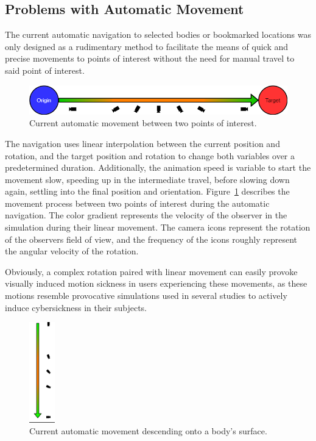 \subsection{Problems with Automatic Movement}\label{subsec:problems-with-automatic-movement}

The current automatic navigation to selected bodies or bookmarked locations was only designed as a rudimentary method
to facilitate the means of quick and precise movements to points of interest without the need for manual travel to
said point of interest.

\begin{figure}[h]
    \centering
    \includegraphics[width=\textwidth]{content/3_current_state/img/OldAutomaticNavigation}
    \caption{Current automatic movement between two points of interest.}
    \label{fig:old-auto-nav}
\end{figure}

The navigation uses linear interpolation between the current position and rotation, and the target position and
rotation to change both variables over a predetermined duration.
Additionally, the animation speed is variable to start the movement slow, speeding up in the intermediate travel,
before slowing down again, settling into the final position and orientation.
Figure~\ref{fig:old-auto-nav} describes the movement process between two points of interest during the automatic
navigation.
The color gradient represents the velocity of the observer in the simulation during their linear movement.
The camera icons represent the rotation of the observers field of view, and the frequency of the icons roughly
represent the angular velocity of the rotation.

Obviously, a complex rotation paired with linear movement can easily provoke visually induced motion sickness in
users experiencing these movements, as these motions resemble provocative simulations used in several studies to
actively induce cybersickness in their subjects.


\begin{figure}
    \centering
    \includegraphics[width=0.1\textwidth]{content/3_current_state/img/OldAutomaticNavigation_Landing}
    \caption{Current automatic movement descending onto a body's surface.}
    \label{fig:old-auto-nav-descend}
\end{figure}

